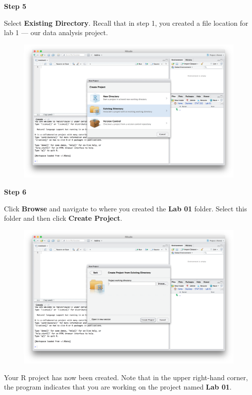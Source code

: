 \documentclass[]{book}
\theoremstyle{definition}
\theoremstyle{definition}
\theoremstyle{definition}
\theoremstyle{remark}
\begin{document}
\textbf{Step 5}

Select \textbf{Existing Directory}. Recall that in step 1, you created a
file location for lab 1 --- our data analysis project.

\begin{figure}
\centering
\includegraphics{./assets/images/01-03.png}
\caption{}
\end{figure}

\textbf{Step 6}

Click \textbf{Browse} and navigate to where you created the \textbf{Lab
01} folder. Select this folder and then click \textbf{Create Project}.

\begin{figure}
\centering
\includegraphics{./assets/images/01-04.png}
\caption{}
\end{figure}

Your R project has now been created. Note that in the upper right-hand
corner, the program indicates that you are working on the project named
\textbf{Lab 01}.
\end{document}
